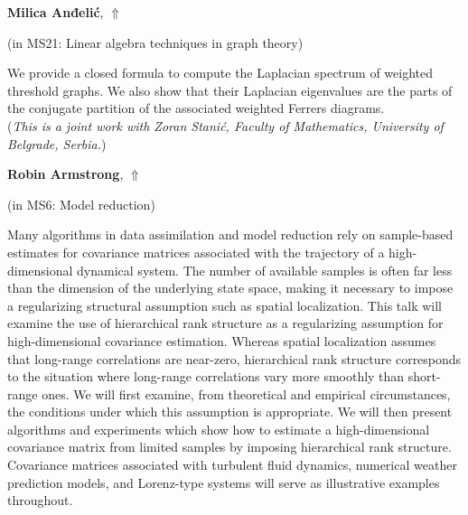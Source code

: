 \documentclass[ILAS2025-program.tex]{subfiles}
\begin{document}
\hypertarget{down0338}{}\begin{ilasabstract}
    
\textbf{Milica Anđelić},  \hfill \hyperlink{up0338}{$\Uparrow$}
    
    
(in {\color{mstitle}MS21: Linear algebra techniques in graph theory})
        
\mtskip
    We provide a closed  formula to compute the Laplacian spectrum of weighted threshold graphs. We also  show that their Laplacian eigenvalues are the parts of the conjugate partition of the associated   weighted Ferrers diagrams. \\

({\it This is a joint work with Zoran Stani\'c, Faculty of Mathematics, University of Belgrade, Serbia.})
\end{ilasabstract}
    

\hypertarget{down0168}{}\begin{ilasabstract}
    
\textbf{Robin Armstrong},  \hfill \hyperlink{up0168}{$\Uparrow$}
    
    
(in {\color{mstitle}MS6: Model reduction})
        
\mtskip
    Many algorithms in data assimilation and model reduction rely on sample-based estimates for covariance matrices associated with the trajectory of a high-dimensional dynamical system. The number of available samples is often far less than the dimension of the underlying state space, making it necessary to impose a regularizing structural assumption such as spatial localization. This talk will examine the use of hierarchical rank structure as a regularizing assumption for high-dimensional covariance estimation. Whereas spatial localization assumes that long-range correlations are near-zero, hierarchical rank structure corresponds to the situation where long-range correlations vary more smoothly than short-range ones. We will first examine, from theoretical and empirical circumstances, the conditions under which this assumption is appropriate. We will then present algorithms and experiments which show how to estimate a high-dimensional covariance matrix from limited samples by imposing hierarchical rank structure. Covariance matrices associated with turbulent fluid dynamics, numerical weather prediction models, and Lorenz-type systems will serve as illustrative examples throughout.

\end{ilasabstract}
    
\end{document}
